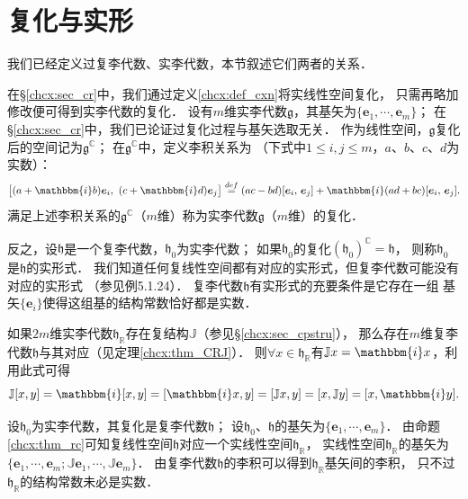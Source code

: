 \section{复化与实形}
我们已经定义过复李代数、实李代数，本节叙述它们两者的关系．

在\S\ref{chcx:sec_cr}中，我们通过定义\ref{chcx:def_cxn}将实线性空间复化，
只需再略加修改便可得到实李代数的复化．
设有$m$维实李代数$\mathfrak{g}$，其基矢为$\{\boldsymbol{e}_1,\cdots,\boldsymbol{e}_m\}$；
在\S\ref{chcx:sec_cr}中，我们已论证过复化过程与基矢选取无关．
作为线性空间，$\mathfrak{g}$复化后的空间记为$\mathfrak{g}^{\mathbb{C}}$；
在$\mathfrak{g}^{\mathbb{C}}$中，定义李积关系为
（下式中$1\leqslant i,j\leqslant m$，$a$、$b$、$c$、$d$为实数）：
\begin{equation}
    \bigl[(a+\mathbbm{i}b) \boldsymbol{e}_i,\ (c+\mathbbm{i}d) \boldsymbol{e}_j \bigr] \overset{def}{=}
    (ac-bd)[\boldsymbol{e}_i,\, \boldsymbol{e}_j] + \mathbbm{i}(ad+bc)[\boldsymbol{e}_i,\, \boldsymbol{e}_j].
\end{equation}
满足上述李积关系的$\mathfrak{g}^{\mathbb{C}}$（$m$维）称为实李代数$\mathfrak{g}$（$m$维）的{\heiti 复化}．


反之，设$\mathfrak{h}$是一个复李代数，$\mathfrak{h}_{0}$为实李代数；
如果$\mathfrak{h}_{0}$的复化$(\mathfrak{h}_{0})^{\mathbb{C}}=\mathfrak{h}$，
则称$\mathfrak{h}_{0}$是$\mathfrak{h}$的{\heiti 实形式}．
我们知道任何复线性空间都有对应的实形式，但复李代数可能没有对应的实形式
（参见\parencite[p.88]{Hilgert-2012}例5.1.24）．
复李代数$\mathfrak{h}$有实形式的充要条件是它存在一组
基矢$\{\boldsymbol{e}_i\}$使得这组基的结构常数恰好都是实数．

如果$2m$维实李代数$\mathfrak{h}_{\mathbb{R}}$存在复结构$\mathbb{J}$（参见\S\ref{chcx:sec_cpstru}），
那么存在$m$维复李代数$\mathfrak{h}$与其对应（见定理\ref{chcx:thm_CRJ}）．
则$\forall x \in \mathfrak{h}_{\mathbb{R}}$有$\mathbb{J} x = \mathbbm{i}x$，利用此式可得
\begin{equation}
    \mathbb{J}[x,y]= \mathbbm{i} [x,y]=[\mathbbm{i} x,y]=[\mathbb{J}x,y]=[x,\mathbb{J}y]=[x,\mathbbm{i}y].
\end{equation}



设$\mathfrak{h}_{0}$为实李代数，其复化是复李代数$\mathfrak{h}$；
设$\mathfrak{h}_{0}$、$\mathfrak{h}$的基矢为$\{\boldsymbol{e}_1,\cdots,\boldsymbol{e}_m\}$．
由命题\ref{chcx:thm_rc}可知复线性空间$\mathfrak{h}$对应一个实线性空间$\mathfrak{h}_{\mathbb{R}}$，
实线性空间$\mathfrak{h}_{\mathbb{R}}$的基矢为$\{\boldsymbol{e}_1,\cdots,\boldsymbol{e}_m;
\mathbb{J}\boldsymbol{e}_1,\cdots,\mathbb{J}\boldsymbol{e}_m\}$．
由复李代数$\mathfrak{h}$的李积可以得到$\mathfrak{h}_{\mathbb{R}}$基矢间的李积，
只不过$\mathfrak{h}_{\mathbb{R}}$的结构常数未必是实数．


